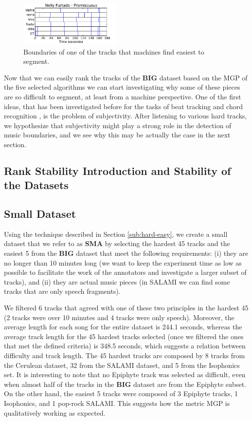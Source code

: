 \documentclass{article}
\begin{document}
\begin{figure}
  \centering
  \includegraphics[width=0.45\textwidth, height=0.13\textheight]{plots/Promiscuous-machine.pdf}
  \caption{Boundaries of one of the tracks that machines find easiest to segment.}
  \label{fig:promiscuous}
\end{figure}%

Now that we can easily rank the tracks of the \textbf{BIG} dataset based on the MGP of the five selected algorithms we can start investigating why some of these pieces are so difficult to segment, at least from a machine perspective. 
One of the first ideas, that has been investigated before for the tasks of beat tracking \cite{Grosche2010} and chord recognition \cite{Ni2013}, is the problem of subjectivity.
After listening to various hard tracks, we hypothesize that subjectivity might play a strong role in the detection of music boundaries, and we see why this may be actually the case in the next section. 


\subsection{Rank Stability Introduction and Stability of the Datasets}

\subsection{Small Dataset}

Using the technique described in Section \ref{sub:hard-easy}, we create a small dataset that we refer to as \textbf{SMA} by selecting the hardest 45 tracks and the easiest 5 from the \textbf{BIG} dataset that meet the following requirements: (i) they are no longer than 10 minutes long (we want to keep the experiment time as low as possible to facilitate the work of the annotators and investigate a larger subset of tracks), and (ii) they are actual music pieces (in SALAMI we can find some tracks that are only speech fragments).

We filtered 6 tracks that agreed with one of these two principles in the hardest 45 (2 tracks were over 10 minutes and 4 tracks were only speech). 
Moreover, the average length for each song for the entire dataset is 244.1 seconds, whereas the average track length for the 45 hardest tracks selected (once we filtered the ones that met the defined criteria) is 348.5 seconds, which suggests a relation between difficulty and track length.
The 45 hardest tracks are composed by 8 tracks from the Cerulean dataset, 32 from the SALAMI dataset, and 5 from the Isophonics set.
It is interesting to note that no Epiphyte track was selected as difficult, even when almost half of the tracks in the \textbf{BIG} dataset are from the Epiphyte subset.
On the other hand, the easiest 5 tracks were composed of 3 Epiphyte tracks, 1 Isophonics, and 1 pop-rock SALAMI.
This suggests how the metric MGP is qualitatively working as expected.
\end{document}
